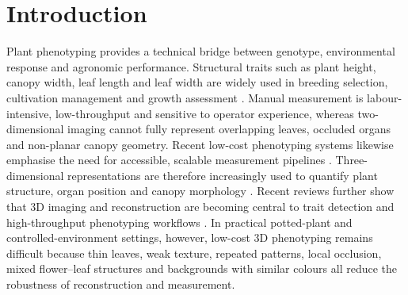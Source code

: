 \documentclass[a4paper]{cas-sc}
\begin{document}
\maketitle

\section{Introduction}\label{sec:introduction}

Plant phenotyping provides a technical bridge between genotype, environmental response and agronomic performance. Structural traits such as plant height, canopy width, leaf length and leaf width are widely used in breeding selection, cultivation management and growth assessment \cite{ref6,ref56,ref61}. Manual measurement is labour-intensive, low-throughput and sensitive to operator experience, whereas two-dimensional imaging cannot fully represent overlapping leaves, occluded organs and non-planar canopy geometry. Recent low-cost phenotyping systems likewise emphasise the need for accessible, scalable measurement pipelines \cite{ref62,ref63}. Three-dimensional representations are therefore increasingly used to quantify plant structure, organ position and canopy morphology \cite{ref8,ref10}. Recent reviews further show that 3D imaging and reconstruction are becoming central to trait detection and high-throughput phenotyping workflows \cite{ref9,ref11,ref12}. In practical potted-plant and controlled-environment settings, however, low-cost 3D phenotyping remains difficult because thin leaves, weak texture, repeated patterns, local occlusion, mixed flower--leaf structures and backgrounds with similar colours all reduce the robustness of reconstruction and measurement.
\end{document}
